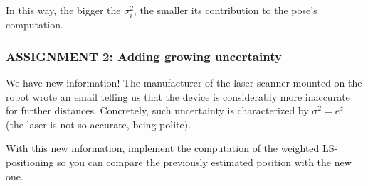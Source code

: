 \documentclass[11pt]{article}
\begin{document}
In this way, the bigger the \(\sigma_i^2\), the smaller its contribution
to the pose's computation.

    \hypertarget{assignment-2-adding-growing-uncertainty}{%
\subsubsection{\texorpdfstring{\textbf{{ASSIGNMENT 2: Adding growing
uncertainty}}}{ASSIGNMENT 2: Adding growing uncertainty}}\label{assignment-2-adding-growing-uncertainty}}

We have new information! The manufacturer of the laser scanner mounted
on the robot wrote an email telling us that the device is considerably
more inaccurate for further distances. Concretely, such uncertainty is
characterized by \(\sigma^2=e^z\) (the laser is not so accurate, being
polite).

With this new information, implement the computation of the weighted
LS-positioning so you can compare the previously estimated position with
the new one.
\end{document}
